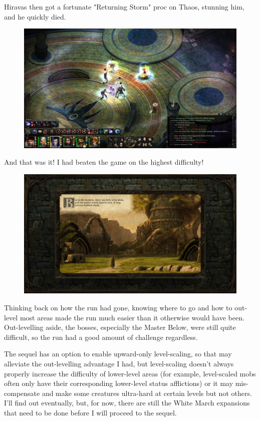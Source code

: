 \documentclass{article}
\begin{document}
Hiravas then got a fortunate "Returning Storm" proc on Thaos, stunning him, and he quickly died.

\begin{figure}
\includegraphics[scale=0.33]{files/blog/2019_03_17_pillars_of_eternity_path_of_the_damned_act_iv/2019_03_17_thaos6.jpg}
\end{figure}

And that was it!  I had beaten the game on the highest difficulty!

\begin{figure}
\includegraphics[scale=0.33]{files/blog/2019_03_17_pillars_of_eternity_path_of_the_damned_act_iv/2019_03_17_end.jpg}
\end{figure}

Thinking back on how the run had gone, knowing where to go and how to out-level most areas made the run much easier than it otherwise would have been.  Out-levelling aside, the bosses, especially the Master Below, were still quite difficult, so the run had a good amount of challenge regardless.

The sequel has an option to enable upward-only level-scaling, so that may alleviate the out-levelling advantage I had, but level-scaling doesn't always properly increase the difficulty of lower-level areas (for example, level-scaled mobs often only have their corresponding lower-level status afflictions) or it may mis-compensate and make some creatures ultra-hard at certain levels but not others.  I'll find out eventually, but, for now, there are still the White March expansions that need to be done before I will proceed to the sequel.
\end{document}
